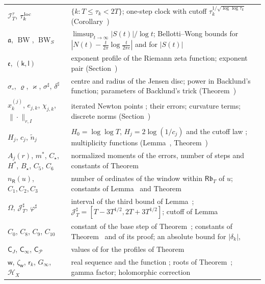 \documentclass[preprint,12pt]{elsarticle}
\makeatletter
\let\CG@origref\ref
\let\CG@origeqref\eqref
\newcommand{\CG@gettip}[1]{\@ifundefined{CGTip@#1}{Reference: #1}{\csname CGTip@#1\endcsname}}
\DeclareRobustCommand{\CGref}[1]{\pdftooltip{\CG@origref{#1}}{\CG@gettip{#1}}}
\DeclareRobustCommand{\CGeqref}[1]{\pdftooltip{\CG@origeqref{#1}}{\CG@gettip{#1}}}
\numberwithin{equation}{section}
\theoremstyle{plain}
\theoremstyle{definition}
\theoremstyle{remark}
\newcommand{\BW}{\operatorname{BW}}
\newcommand{\BWS}{\operatorname{BW}_S}
\makeatother
\begin{document}
\begin{center}
\begin{longtable}{p{}p{}}
$\mathcal I_T^\tau$, $\tau_k^{\rm loc}$ & $\{k:T\le\tau_k<2T\}$; one-step clock with cutoff $\tau_k^{1/\sqrt{\log\log\tau_k}}$ (Corollary~\CGref{cor:local_clock})\\
$\mathfrak a$, $\BW$, $\BWS$ & $\limsup_{t\to\infty}|S(t)|/\log t$; Bellotti--Wong bounds for $|N(t)-\frac t{2\pi}\log\frac t{2\pi e}|$ and for $|S(t)|$ \CGeqref{eq:BWS_def}\\
$\mathfrak e$, $(\mathsf k,\mathsf l)$ & exponent profile of the Riemann zeta function; exponent pair (Section~\CGref{sec:envelope})\\
$\sigma_\circ$, $\varrho$, $\varkappa$, $\sigma^\sharp$, $\delta^\sharp$ & centre and radius of the Jensen disc; power in Backlund's function; parameters of Backlund's trick (Theorem~\CGref{thm:known_backlund})\\
$x^{(j)}_k$, $e_{j,k}$, $\chi_{j,k}$, $\|\cdot\|_{r,I}$ & iterated Newton points \CGeqref{eq:newton_iteration}; their errors; curvature terms; discrete norms (Section~\CGref{sec:iteration})\\
$H_j$, $c_j$, $\tilde n_j$ & $H_0=\log\log T$, $H_j=2\log(1/c_j)$ and the cutoff law \CGeqref{eq:cutoff_law}; multiplicity functions (Lemma~\CGref{lem:multiplicity}, Theorem~\CGref{thm:multiplicity_all})\\
$A_j(r)$, $m^*$, $C_\star$, $H^*$, $B_\star$, $C_5$, $C_6$ & normalized moments of the errors, number of steps and constants of Theorem~\CGref{thm:uniform_iteration}\\
$n_{\mathsf R}(u)$, $C_1,C_2,C_3$ & number of ordinates of the window within $\mathsf R\mathfrak b_T$ of $u$; constants of Lemma~\CGref{lem:zero_pairs} and Theorem~\CGref{thm:multiplicity_all}\\
$\Omega$, $\mathcal J_T^\sharp$, $\varphi^\sharp$ & interval of the third bound of Lemma~\CGref{lem:higher_moments}; $\mathcal J_T^\sharp=[T-3T^{1/2},2T+3T^{1/2}]$; cutoff of Lemma~\CGref{lem:sampling_rho}\\
$C_0$, $C_8$, $C_9$, $C_{10}$ & constant of the base step of Theorem~\CGref{thm:uniform_iteration}; constants of Theorem~\CGref{thm:tails} and of its proof; an absolute bound for $|\delta_k|$, \CGeqref{eq:BW_pointwise}\\
$\mathsf C_J$, $\mathsf C_\infty$, $\mathsf C_{\mathcal P}$ & values of \CGeqref{eq:envelope_formula} for the profiles of Theorem~\CGref{thm:envelope}\\
$\mathsf w$, $\zeta_{\mathsf w}$, $\mathsf r_k$, $G_\infty$, $\mathcal H_X$ & real sequence and the function \CGeqref{eq:zeta_kappa}; roots of Theorem~\CGref{thm:euler_product}; gamma factor; holomorphic correction \CGeqref{eq:euler_product}\\

\end{longtable}
\end{center}
\end{document}
